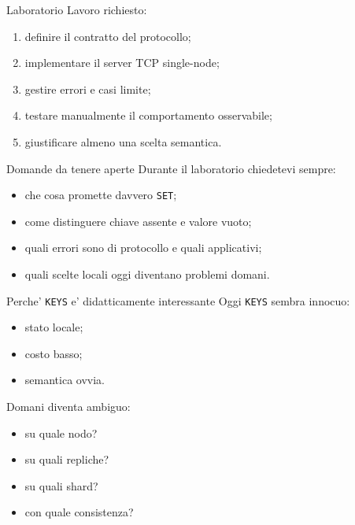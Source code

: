 \documentclass[aspectratio=169]{beamer}
\begin{document}
\begin{frame}{Laboratorio}
  Lavoro richiesto:

  \begin{enumerate}
    \item definire il contratto del protocollo;
    \item implementare il server TCP single-node;
    \item gestire errori e casi limite;
    \item testare manualmente il comportamento osservabile;
    \item giustificare almeno una scelta semantica.
  \end{enumerate}

\end{frame}

\begin{frame}{Domande da tenere aperte}
  Durante il laboratorio chiedetevi sempre:

  \begin{itemize}
    \item che cosa promette davvero \texttt{SET};
    \item come distinguere chiave assente e valore vuoto;
    \item quali errori sono di protocollo e quali applicativi;
    \item quali scelte locali oggi diventano problemi domani.
  \end{itemize}
\end{frame}

\begin{frame}{Perche' \texttt{KEYS} e' didatticamente interessante}
  Oggi \texttt{KEYS} sembra innocuo:

  \begin{itemize}
    \item stato locale;
    \item costo basso;
    \item semantica ovvia.
  \end{itemize}

  Domani diventa ambiguo:

  \begin{itemize}
    \item su quale nodo?
    \item su quali repliche?
    \item su quali shard?
    \item con quale consistenza?
  \end{itemize}
\end{frame}
\end{document}
